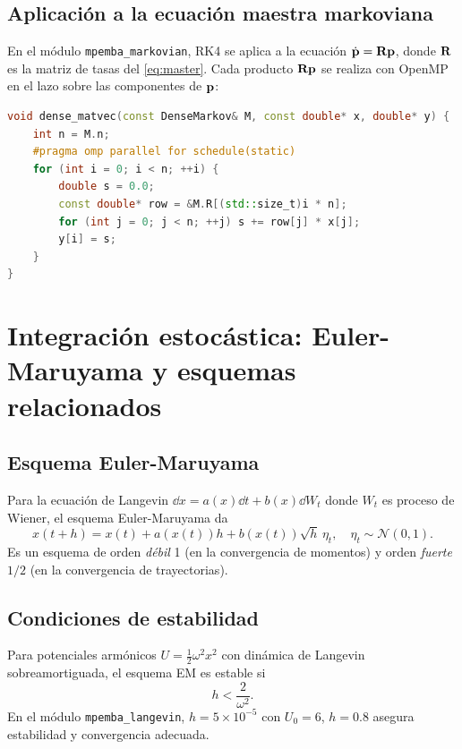 \subsection{Aplicación a la ecuación maestra markoviana}

En el módulo \texttt{mpemba\_markovian}, RK4 se aplica a la ecuación
$\dot{\vb{p}} = \vb{R} \vb{p}$, donde $\vb{R}$ es la matriz de tasas del 
\cref{eq:master}. Cada producto $\vb{R}\vb{p}$ se realiza con OpenMP en el lazo 
sobre las componentes de $\vb{p}$:
\begin{lstlisting}[language=C++,caption={Multiplicación matriz-vector paralelizada}]
void dense_matvec(const DenseMarkov& M, const double* x, double* y) {
    int n = M.n;
    #pragma omp parallel for schedule(static)
    for (int i = 0; i < n; ++i) {
        double s = 0.0;
        const double* row = &M.R[(std::size_t)i * n];
        for (int j = 0; j < n; ++j) s += row[j] * x[j];
        y[i] = s;
    }
}
\end{lstlisting}

\section{Integración estocástica: Euler-Maruyama y esquemas relacionados}

\subsection{Esquema Euler-Maruyama}

Para la ecuación de Langevin $\dd x = a(x) \dd t + b(x) \dd W_t$ donde $W_t$ es 
proceso de Wiener, el esquema Euler-Maruyama da
\begin{equation}
    x(t + h) = x(t) + a(x(t)) h + b(x(t)) \sqrt{h} \, \eta_t, 
    \quad \eta_t \sim \mathcal{N}(0, 1).
    \label{eq:em_method}
\end{equation}
%
Es un esquema de orden \emph{débil} 1 (en la convergencia de momentos) y orden 
\emph{fuerte} $1/2$ (en la convergencia de trayectorias).

\subsection{Condiciones de estabilidad}

Para potenciales armónicos $U = \tfrac{1}{2}\omega^2 x^2$ con dinámica de 
Langevin sobreamortiguada, el esquema EM es estable si
\begin{equation}
    h < \frac{2}{\omega^2}.
\end{equation}
%
\noindent En el módulo \texttt{mpemba\_langevin}, $h = 5 \times 10^{-5}$ con 
$U_0 = 6$, $h = 0.8$ asegura estabilidad y convergencia adecuada.


